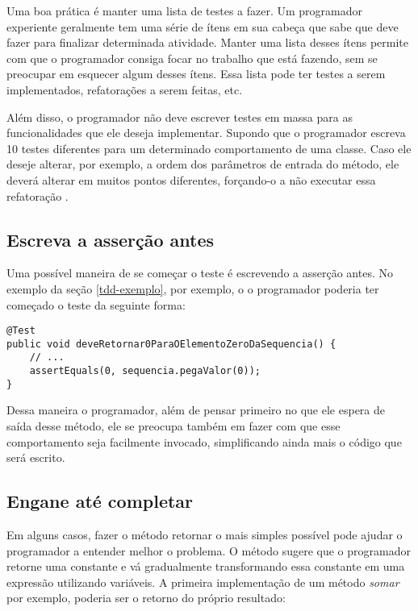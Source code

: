 Uma boa prática é manter uma lista de testes a fazer. Um programador experiente geralmente tem uma série de ítens em sua cabeça
que sabe que deve fazer para finalizar determinada atividade. Manter uma lista desses ítens permite com que o programador 
consiga focar no trabalho que está fazendo, sem se preocupar em esquecer algum desses ítens. 
Essa lista pode ter testes a serem implementados, refatorações a serem feitas, etc. 

Além disso, o programador não deve escrever testes em massa para as funcionalidades que ele deseja implementar. Supondo que o programador
escreva 10 testes diferentes para um determinado comportamento de uma classe. Caso ele deseje alterar, por exemplo, a ordem dos parâmetros
de entrada do método, ele deverá alterar em muitos pontos diferentes, forçando-o a não executar essa refatoração \cite{TDDByExample}.

\subsection{Escreva a asserção antes}

Uma possível maneira de se começar o teste é escrevendo a asserção antes. No exemplo da seção \ref{tdd-exemplo}, por exemplo, o 
o programador poderia ter começado o teste da seguinte forma:

\begin{lstlisting}[frame=trbl]
@Test
public void deveRetornar0ParaOElementoZeroDaSequencia() {
	// ...
	assertEquals(0, sequencia.pegaValor(0));
}
\end{lstlisting}

Dessa maneira o programador, além de pensar primeiro no que ele espera de saída desse método, ele se preocupa também 
em fazer com que esse comportamento seja facilmente invocado, simplificando ainda mais o código que será escrito. 

\subsection{Engane até completar}

Em alguns casos, fazer o método retornar o mais simples possível pode ajudar o programador a entender melhor o problema.
O método sugere que o programador retorne uma constante e vá gradualmente transformando essa constante em uma expressão
utilizando variáveis. A primeira implementação de um método \textit{somar} por exemplo, poderia ser o retorno do 
próprio resultado:

